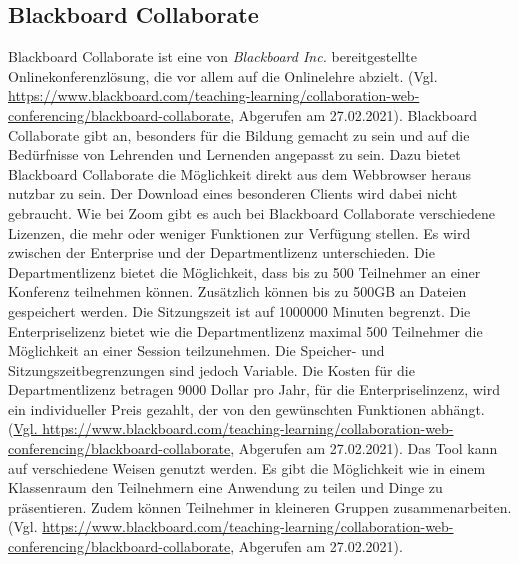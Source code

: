 \subsection{Blackboard Collaborate}
Blackboard Collaborate ist eine von \textit{Blackboard Inc.} bereitgestellte Onlinekonferenzlösung, die vor allem auf die Onlinelehre abzielt. (Vgl. \url{https://www.blackboard.com/teaching-learning/collaboration-web-conferencing/blackboard-collaborate}, Abgerufen am 27.02.2021).
Blackboard Collaborate gibt an, besonders für die Bildung gemacht zu sein und auf die Bedürfnisse von Lehrenden und Lernenden angepasst zu sein. Dazu bietet Blackboard Collaborate die Möglichkeit direkt aus dem Webbrowser heraus nutzbar zu sein. Der Download eines besonderen Clients wird dabei nicht gebraucht. Wie bei Zoom gibt es auch bei Blackboard Collaborate verschiedene Lizenzen, die mehr oder weniger Funktionen zur Verfügung stellen. Es wird zwischen der Enterprise und der Departmentlizenz unterschieden. Die Departmentlizenz bietet die Möglichkeit, dass bis zu 500 Teilnehmer an einer Konferenz teilnehmen können. Zusätzlich können bis zu 500GB an Dateien gespeichert werden. Die Sitzungszeit ist auf 1000000 Minuten begrenzt. Die Enterpriselizenz bietet wie die Departmentlizenz maximal 500 Teilnehmer die Möglichkeit an einer Session teilzunehmen. Die Speicher- und Sitzungszeitbegrenzungen sind jedoch Variable. Die Kosten für die Departmentlizenz betragen 9000 Dollar pro Jahr, für die Enterpriselinzenz, wird ein individueller Preis gezahlt, der von den gewünschten Funktionen abhängt. (\url{Vgl. https://www.blackboard.com/teaching-learning/collaboration-web-conferencing/blackboard-collaborate}, Abgerufen am 27.02.2021).
Das Tool kann auf verschiedene Weisen genutzt werden. Es gibt die Möglichkeit wie in einem Klassenraum den Teilnehmern eine Anwendung zu teilen und Dinge zu präsentieren. Zudem können Teilnehmer in kleineren Gruppen zusammenarbeiten. (Vgl. \url{https://www.blackboard.com/teaching-learning/collaboration-web-conferencing/blackboard-collaborate}, Abgerufen am 27.02.2021).


